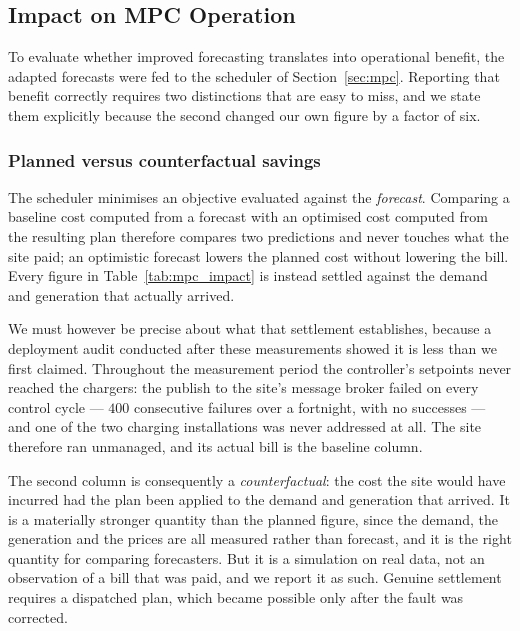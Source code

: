 \documentclass[journal]{IEEEtran}
\begin{document}
\subsection{Impact on MPC Operation}
\label{sec:results_mpc}

To evaluate whether improved forecasting translates into operational
benefit, the adapted forecasts were fed to the scheduler of
Section~\ref{sec:mpc}. Reporting that benefit correctly requires two
distinctions that are easy to miss, and we state them explicitly because
the second changed our own figure by a factor of six.

\subsubsection{Planned versus counterfactual savings}
The scheduler minimises an objective evaluated against the \emph{forecast}.
Comparing a baseline cost computed from a forecast with an optimised cost
computed from the resulting plan therefore compares two predictions and
never touches what the site paid; an optimistic forecast lowers the planned
cost without lowering the bill. Every figure in
Table~\ref{tab:mpc_impact} is instead settled against the demand and
generation that actually arrived.

We must however be precise about what that settlement establishes, because a
deployment audit conducted after these measurements showed it is less than we
first claimed. Throughout the measurement period the controller's setpoints
never reached the chargers: the publish to the site's message broker failed on
every control cycle --- $400$ consecutive failures over a fortnight, with no
successes --- and one of the two charging installations was never addressed at
all. The site therefore ran unmanaged, and its actual bill is the baseline
column.

The second column is consequently a \emph{counterfactual}: the cost the site
would have incurred had the plan been applied to the demand and generation that
arrived. It is a materially stronger quantity than the planned figure, since
the demand, the generation and the prices are all measured rather than
forecast, and it is the right quantity for comparing forecasters. But it is a
simulation on real data, not an observation of a bill that was paid, and we
report it as such. Genuine settlement requires a dispatched plan, which became
possible only after the fault was corrected.
\end{document}
